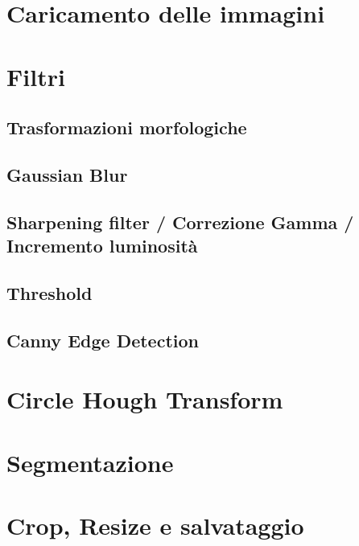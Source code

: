 \documentclass[12pt,twoside,openright]{report}
\begin{document}
  \section{Caricamento delle immagini}
  
  \section{Filtri}
  
  \subsection{Trasformazioni morfologiche}
  
  \subsection{Gaussian Blur}
  
  \subsection{Sharpening filter / Correzione Gamma / Incremento luminosità}
  
  \subsection{Threshold}
  
  \subsection{Canny Edge Detection}
  
  \section{Circle Hough Transform}
  
  \section{Segmentazione}
  
  \section{Crop, Resize e salvataggio}
  
  
\end{document}

